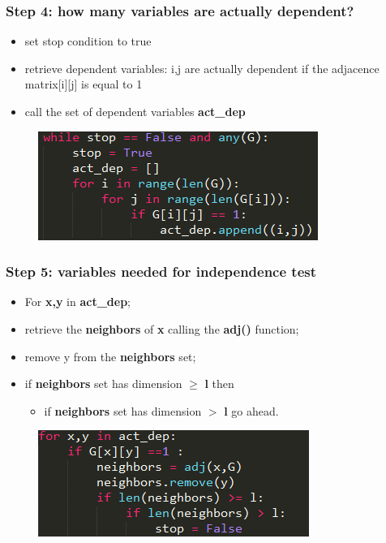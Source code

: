\documentclass[xcolor ={table,usenames,dvipsnames}]{beamer}
\theoremstyle{definition}
\begin{document}
\begin{frame}
\frametitle{Step 4: how many variables are actually dependent?}
\begin{itemize}
	\item set stop condition to true
	\item retrieve dependent variables: i,j are actually dependent if the adjacence matrix[i][j] is equal to 1
	\item call the set of dependent variables \textbf{act\_dep}
\end{itemize}
	\begin{figure}[h!]
		\centering
		\includegraphics[scale=0.8]{img/depvar.PNG}
	\end{figure}

\end{frame}
\begin{frame}
\frametitle{Step 5: variables needed for independence test}
\begin{itemize}
	\item For \textbf{x,y} in \textbf{act\_dep};
	\item retrieve the \textbf{neighbors} of \textbf{x} calling the \textbf{adj()} function;
	\item remove y from the \textbf{neighbors} set;
	\item if \textbf{neighbors} set has dimension $\ge$ \textbf{l} then \begin{itemize}
	\item if \textbf{neighbors} set has dimension $>$ \textbf{l} go ahead.
	\end{itemize}
\end{itemize}
	\begin{figure}[h!]
		\centering
		\includegraphics[scale=0.8]{img/indepvar.PNG}
	\end{figure}
\end{frame}
\end{document}
